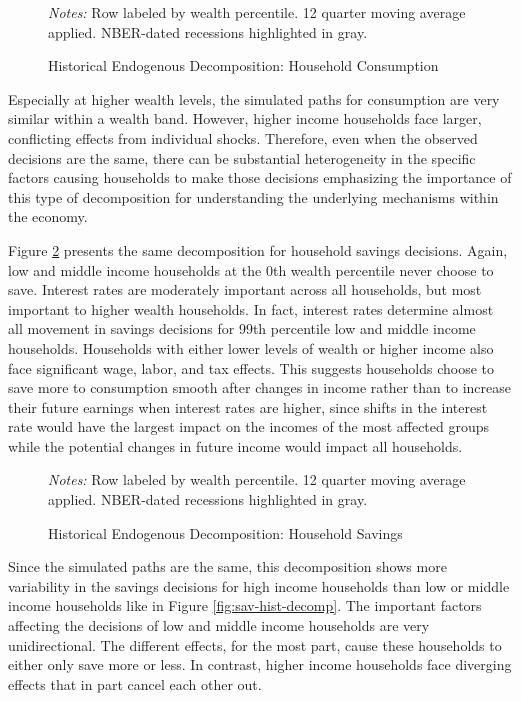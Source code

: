 \begin{figure}[t!]
    \centering
    \caption{Historical Endogenous Decomposition: Household Consumption}
    

    {\scriptsize \emph{Notes:} Row labeled by wealth percentile. 12 quarter moving average applied. NBER-dated recessions highlighted in gray.}
    \label{fig:cons-endog-hist-decomp}
\end{figure}

Especially at higher wealth levels, the simulated paths for consumption are very similar within a wealth band. However, higher income households face larger, conflicting effects from individual shocks. Therefore, even when the observed decisions are the same, there can be substantial heterogeneity in the specific factors causing households to make those decisions emphasizing the importance of this type of decomposition for understanding the underlying mechanisms within the economy. 

Figure \ref{fig:sav-endog-hist-decomp} presents the same decomposition for household savings decisions. Again, low and middle income households at the 0th wealth percentile never choose to save. Interest rates are moderately important across all households, but most important to higher wealth households. In fact, interest rates determine almost all movement in savings decisions for 99th percentile low and middle income households. Households with either lower levels of wealth or higher income also face significant wage, labor, and tax effects. This suggests households choose to save more to consumption smooth after changes in income rather than to increase their future earnings when interest rates are higher, since shifts in the interest rate would have the largest impact on the incomes of the most affected groups while the potential changes in future income would impact all households.

\begin{figure}[t!]
    \centering
    \caption{Historical Endogenous Decomposition: Household Savings}
    

    {\scriptsize \emph{Notes:} Row labeled by wealth percentile. 12 quarter moving average applied. NBER-dated recessions highlighted in gray.}
    \label{fig:sav-endog-hist-decomp}
\end{figure}

Since the simulated paths are the same, this decomposition shows more variability in the savings decisions for high income households than low or middle income households like in Figure \ref{fig:sav-hist-decomp}. The important factors affecting the decisions of low and middle income households are very unidirectional. The different effects, for the most part, cause these households to either only save more or less. In contrast, higher income households face diverging effects that in part cancel each other out.
